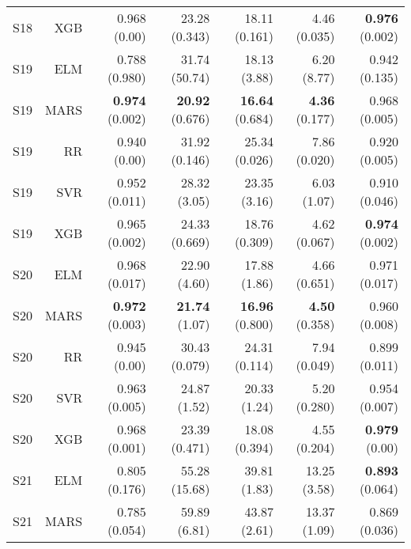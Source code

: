 \begin{table}
\begin{tabular}{rrrrrrr}
    S18 &       XGB &                        0.968 (0.00) &             23.28 (0.343) &           18.11 (0.161) &            4.46 (0.035) &  { \bf 0.976} (0.002) \\
    S19 &       ELM &                       0.788 (0.980) &             31.74 (50.74) &            18.13 (3.88) &             6.20 (8.77) &         0.942 (0.135) \\
    S19 &      MARS &                { \bf 0.974} (0.002) &      { \bf 20.92} (0.676) &    { \bf 16.64} (0.684) &     { \bf 4.36} (0.177) &         0.968 (0.005) \\
    S19 &        RR &                        0.940 (0.00) &             31.92 (0.146) &           25.34 (0.026) &            7.86 (0.020) &         0.920 (0.005) \\
    S19 &       SVR &                       0.952 (0.011) &              28.32 (3.05) &            23.35 (3.16) &             6.03 (1.07) &         0.910 (0.046) \\
    S19 &       XGB &                       0.965 (0.002) &             24.33 (0.669) &           18.76 (0.309) &            4.62 (0.067) &  { \bf 0.974} (0.002) \\
    S20 &       ELM &                       0.968 (0.017) &              22.90 (4.60) &            17.88 (1.86) &            4.66 (0.651) &         0.971 (0.017) \\
    S20 &      MARS &                { \bf 0.972} (0.003) &       { \bf 21.74} (1.07) &    { \bf 16.96} (0.800) &     { \bf 4.50} (0.358) &         0.960 (0.008) \\
    S20 &        RR &                        0.945 (0.00) &             30.43 (0.079) &           24.31 (0.114) &            7.94 (0.049) &         0.899 (0.011) \\
    S20 &       SVR &                       0.963 (0.005) &              24.87 (1.52) &            20.33 (1.24) &            5.20 (0.280) &         0.954 (0.007) \\
    S20 &       XGB &                       0.968 (0.001) &             23.39 (0.471) &           18.08 (0.394) &            4.55 (0.204) &   { \bf 0.979} (0.00) \\
    S21 &       ELM &                       0.805 (0.176) &             55.28 (15.68) &            39.81 (1.83) &            13.25 (3.58) &  { \bf 0.893} (0.064) \\
    S21 &      MARS &                       0.785 (0.054) &              59.89 (6.81) &            43.87 (2.61) &            13.37 (1.09) &         0.869 (0.036) \\

\end{tabular}
\end{table}
